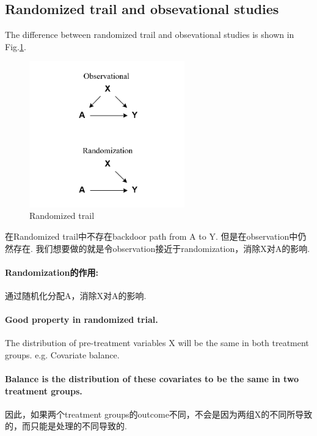 \subsection{Randomized trail and obsevational studies}
The difference between randomized trail and obsevational studies is shown in Fig.\ref{rmtrail}.
\begin{figure}[htbp]
	\setlength{\abovecaptionskip}{0pt}     %
	\setlength{\belowcaptionskip}{10pt}
	\vspace{-0cm}  %
	\setlength{\abovecaptionskip}{-0cm}   %
	\setlength{\belowcaptionskip}{-0cm}   %
	\centering
	\includegraphics[width=0.6\textwidth]{figure/rmtrail.png}
	\caption{Randomized trail}
	\label{rmtrail}
\end{figure}

在Randomized trail中不存在backdoor path from A to Y. 但是在observation中仍然存在. 我们想要做的就是令observation接近于randomization，消除X对A的影响.

\paragraph{Randomization的作用: }通过随机化分配A，消除X对A的影响.
\paragraph{Good property in randomized trial.}The distribution of pre-treatment variables X will be the same in both treatment groups. e.g. {\color{red} Covariate balance.}

\paragraph{Balance is the distribution of these covariates to be the same in two treatment groups.}因此，如果两个treatment groups的outcome不同，不会是因为两组X的不同所导致的，而只能是处理的不同导致的. 

